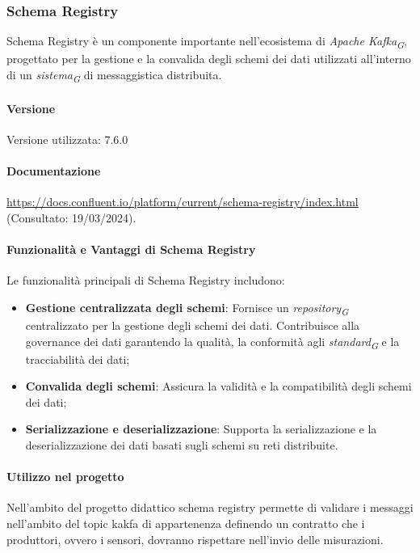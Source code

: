 \subsubsection{Schema Registry}
Schema Registry è un componente importante nell'ecosistema di \textit{Apache Kafka}\textsubscript{\textit{G}}, progettato per la gestione e la convalida degli schemi dei dati utilizzati all'interno di un \textit{sistema}\textsubscript{\textit{G}} di messaggistica distribuita.
\paragraph{Versione}
Versione utilizzata: 7.6.0
\paragraph{Documentazione}
\url{https://docs.confluent.io/platform/current/schema-registry/index.html} (Consultato: 19/03/2024).

\paragraph{Funzionalità e Vantaggi di Schema Registry}
Le funzionalità principali di Schema Registry includono:
\begin{itemize}
    \item \textbf{Gestione centralizzata degli schemi}: Fornisce un \textit{repository}\textsubscript{\textit{G}} centralizzato per la gestione degli schemi dei dati.
    Contribuisce alla governance dei dati garantendo la qualità, la conformità agli \textit{standard}\textsubscript{\textit{G}} e la tracciabilità dei dati;
    \item \textbf{Convalida degli schemi}: Assicura la validità e la compatibilità degli schemi dei dati;
    \item \textbf{Serializzazione e deserializzazione}: Supporta la serializzazione e la deserializzazione dei dati basati sugli schemi su reti distribuite.
\end{itemize}

\paragraph{Utilizzo nel progetto}
Nell'ambito del progetto didattico schema registry permette di validare i messaggi nell'ambito del topic kakfa di appartenenza definendo un contratto che i produttori, ovvero i sensori, dovranno rispettare nell'invio delle misurazioni.